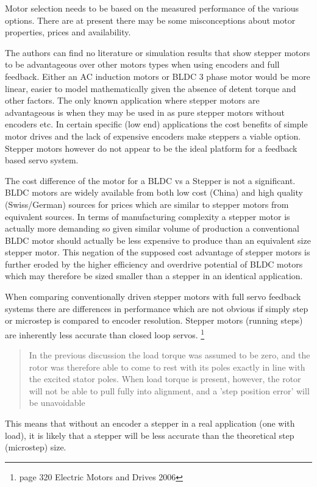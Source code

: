 \documentclass{article}
\begin{document}
Motor selection needs to be based on the measured performance of the various options. There are at present there may be some misconceptions about motor properties, prices and availability. 

\par 
The authors can find no literature or simulation results that show stepper motors to be advantageous over other motors types when using encoders and full feedback. Either an AC induction motors or BLDC 3 phase motor would be more linear, easier to model mathematically given the absence of detent torque and other factors. The only known application where stepper motors are advantageous is when they may be used in as pure stepper motors without encoders etc. In certain specific (low end) applications the cost benefits of simple motor drives and the lack of expensive encoders make steppers a viable option. Stepper motors however do not appear to be the ideal platform for a feedback based servo system.
\par 
The cost difference of the motor for a BLDC vs a Stepper is not a significant. BLDC motors are widely available from both low cost (China) and high quality (Swiss/German) sources for prices which are similar to stepper motors from equivalent sources. In terms of manufacturing complexity a stepper motor is actually more demanding so given similar volume of production a conventional BLDC motor should actually be less expensive to produce than an equivalent size stepper motor. This negation of the supposed cost advantage of stepper motors is further eroded by the higher efficiency and overdrive potential of BLDC motors which may therefore be sized smaller than a stepper in an identical application. 
\par
When comparing conventionally driven stepper motors with full servo feedback systems there are differences in performance which are not obvious if simply step or microstep is compared to encoder resolution. Stepper motors (running steps) are inherently less accurate than closed loop servos. \footnote{page 320 Electric Motors and Drives 2006}
\begin{quote}
In the previous discussion the load torque was assumed to be zero, and the rotor was therefore able to come to rest with its poles exactly in line with the excited stator poles. When load torque is present, however, the rotor will not be able to pull fully into alignment, and a 'step position error' will be unavoidable
\end{quote}
This means that without an encoder a stepper in a real application (one with load), it is likely that a stepper will be less accurate than the theoretical step (microstep) size. 
\end{document}

